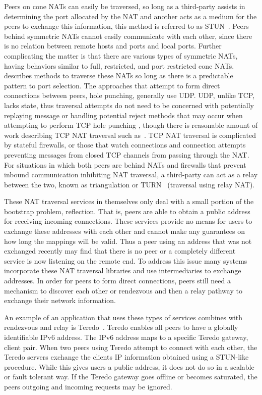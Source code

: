 \documentclass[conference]{IEEEtran}
\begin{document}
Peers on cone NATs can easily be traversed, so long as a third-party assists in
determining the port allocated by the NAT and another acts as a medium for the
peers to exchange this information, this method is referred to as
STUN~\cite{stun_rfc}.  Peers behind symmetric NATs cannot easily communicate
with each other, since there is no relation between remote hosts and ports and
local ports.  Further complicating the matter is that there are various types
of symmetric NATs, having behaviors similar to full, restricted, and port
restricted cone NATs.  \cite{ice} describes methods to traverse these NATs so
long as there is a predictable pattern to port selection.  The approaches that
attempt to form direct connections between peers, hole punching, generally use
UDP.  UDP, unlike TCP, lacks state, thus traversal attempts do not need to be
concerned with potentially replaying message or handling potential reject
methods that may occur when attempting to perform TCP hole punching ,  though
there is reasonable amount of work describing TCP NAT traversal such
as~\cite{tcp_nat}.  TCP NAT traversal is complicated by stateful firewalls, or
those that watch connections and connection attempts preventing messages from
closed TCP channels from passing through the NAT.  For situations in which both
peers are behind NATs and firewalls that prevent inbound communication
inhibiting NAT traversal, a third-party can act as a relay between the two,
known as triangulation or TURN~\cite{turn} (traversal using relay NAT).

These NAT traversal services in themselves only deal with a small portion of
the bootstrap problem, reflection.  That is, peers are able to obtain a public
address for receiving incoming connections.  These services provide no means
for users to exchange these addresses with each other and cannot make any
guarantees on how long the mappings will be valid.  Thus a peer using an
address that was not exchanged recently may find that there is no peer or a
completely different service is now listening on the remote end.  To address
this issue many systems incorporate these NAT traversal libraries and use
intermediaries to exchange addresses.  In order for peers to form direct
connections, peers still need a mechanism to discover each other or rendezvous
and then a relay pathway to exchange their network information.

An example of an application that uses these types of services combines with
rendezvous and relay is Teredo~\cite{teredo}.  Teredo enables all peers to have
a globally identifiable IPv6 address.  The IPv6 address maps to a specific
Teredo gateway, client pair.  When two peers using Teredo attempt to connect
with each other, the Teredo servers exchange the clients IP information
obtained using a STUN-like procedure.  While this gives users a public address,
it does not do so in a scalable or fault tolerant way.  If the Teredo gateway
goes offline or becomes saturated, the peers outgoing and incoming requests may
be ignored.
\end{document}
